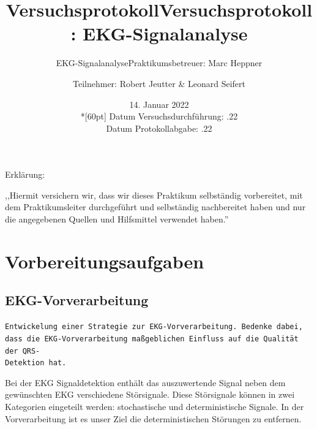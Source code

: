 \documentclass[a4paper,12pt,titlepage]{scrartcl}
\begin{document}
\titlehead
{
    \small
    {
        Technische Universität Ilmenau\\
        Fakulät IA\\
        Fachgebiet Biosignalverarbeitung\\

        Praktikum EKG-Signalanalyse\\
        WS 2021/22}
}

\title {Versuchsprotokoll}
\subtitle{EKG-Signalanalyse}
\author{}
\date{14. Januar 2022\\*[60pt]}

\title {Versuchsprotokoll: EKG-Signalanalyse}
\subtitle{Praktikumsbetreuer: Marc Heppner}
\author{Teilnehmer: Robert Jeutter \& Leonard Seifert}
\date{
    Datum Versuchsdurchführung: .22\\
    Datum Protokollabgabe: .22
}
\maketitle  %

\pagestyle{fancy}
\newpage

\vspace*{8cm}

Erklärung:

\noindent ,,Hiermit versichern wir, dass wir dieses Praktikum selbständig vorbereitet, mit dem Praktikumsleiter durchgeführt und selbständig nachbereitet haben und nur die angegebenen Quellen und Hilfsmittel verwendet haben.''

\newpage

\section{Vorbereitungsaufgaben}
\subsection{EKG-Vorverarbeitung}
\texttt{Entwickelung einer Strategie zur EKG-Vorverarbeitung. Bedenke dabei, dass die EKG-Vorverarbeitung maßgeblichen Einfluss auf die Qualität der QRS-\\ Detektion hat.}

Bei der EKG Signaldetektion enthält das auszuwertende Signal neben dem gewünschten EKG verschiedene Störsignale. Diese Störsignale können in zwei Kategorien eingeteilt werden: stochastische und deterministische Signale. In der Vorverarbeitung ist es unser Ziel die deterministischen Störungen zu entfernen.
\end{document}
